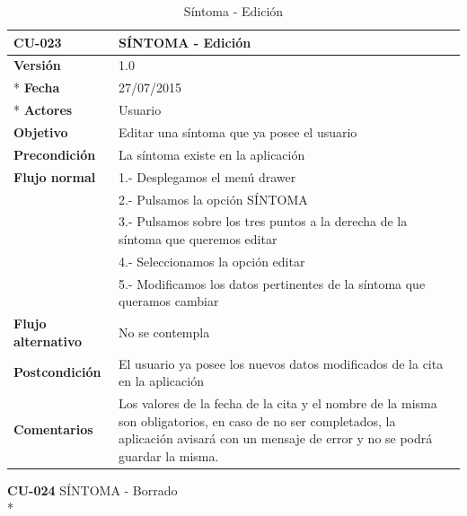 \documentclass[../pfc.tex]{subfiles}
\begin{document}
	\begin{table}[H]
		\centering
		\begin{tabular}[t]{|p{3cm}|p{9.5cm}|}
			\hline \textbf{CU-023} & \textbf{SÍNTOMA - Edición} \\*
			\hline\hline \textbf{Versión} & 1.0 \\ *
			\hline\hline \textbf{Fecha} & 27/07/2015 \\ *
			\hline\textbf{Actores} 	& Usuario\\*
			\hline \textbf{Objetivo} & Editar una síntoma que ya posee el usuario\\* 			
			\hline \textbf{Precondición} & La síntoma existe en la aplicación\\* 
			\hline \textbf{Flujo normal} & 1.- Desplegamos el menú drawer \\* 
			& 2.- Pulsamos la opción SÍNTOMA\\*	
			& 3.- Pulsamos sobre los tres puntos a la derecha de la síntoma que queremos editar\\*	
			& 4.- Seleccionamos la opción editar\\*	
			& 5.- Modificamos los datos pertinentes de la síntoma que queramos cambiar\\*	
			\hline \textbf{Flujo alternativo} & No se contempla \\* 
			\hline \textbf{Postcondición} & El usuario ya posee los nuevos datos modificados de la cita en la aplicación \\* 
			\hline \textbf{Comentarios}   & Los valores de la fecha de la cita y el nombre de la misma son obligatorios, en caso de no ser completados, la aplicación avisará con un mensaje de error y no se podrá guardar la misma.\\*
			\hline
		\end{tabular}
		\caption{Síntoma - Edición}
		\label{tabla:caso023}
	\end{table}
	
	\textbf{CU-024}	SÍNTOMA - Borrado\\*
	
\end{document}
